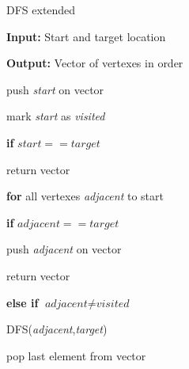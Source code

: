 \documentclass[../Head/Main.tex]{subfiles}
\begin{document}
\begin{Pseudo}{DFS extended}{}

\textbf{Input:} Start and target location 

\textbf{Output:} Vector of vertexes in order


	\begin{Indentation}
		\item push \textit{start} on vector 
		\item mark \textit{start} as \textit{visited} 
		\item[ ] 
		\item \textbf{if} $\textit{start}==\textit{target}$
		\item return vector
		\item[ ]
	\item \textbf{for} all vertexes \textit{adjacent} to start
	\item \textbf{if} $\textit{adjacent}==\textit{target}$
		\item push \textit{adjacent} on vector 
		\item return vector
		\item[ ]
	\item \textbf{else if} $\textit{adjacent}\neq\textit{visited}$
	\item DFS(\textit{adjacent},\textit{target})
	\item pop last element from vector 

	\end{Indentation}
	
	
\end{Pseudo} 
\end{document}
